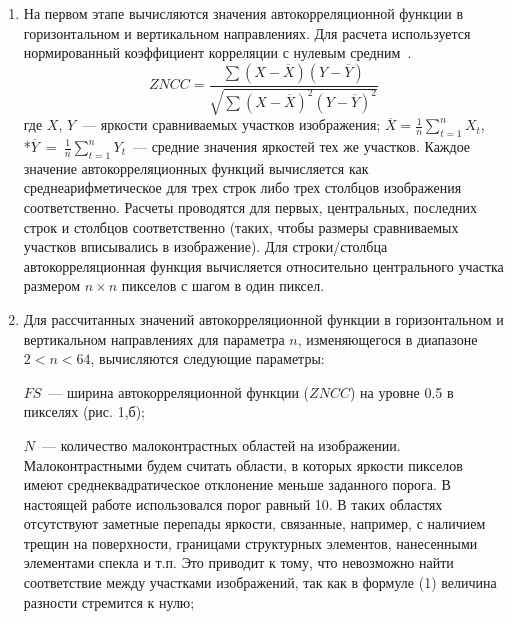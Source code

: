 \documentclass[a4paper]{jctart10}
\begin{document}
\begin{enumerate}
\item На первом этапе вычисляются значения автокорреляционной функции в горизонтальном и вертикальном направлениях. Для расчета используется нормированный коэффициент корреляции с нулевым средним~\cite{13, 14}.
\begin{equation}
ZNCC =\frac{\sum(X-\overline{X})(Y-\overline{Y})}{\sqrt{\sum(X-\overline{X})^{2}(Y-\overline{Y})^{2}}}
\end{equation}
где $X$, $Y$~--- яркости сравниваемых участков изображения;
$\overline{X} = \frac{1}{n}\sum^{n}_{t=1}X_{t}$,\\*$\overline{Y}~=~\frac{1}{n}\sum^{n}_{t=1}Y_{t}$~--- средние значения яркостей тех же участков. Каждое значение автокорреляционных функций вычисляется как среднеарифметическое для трех строк либо трех столбцов изображения соответственно. Расчеты проводятся для первых, центральных, последних строк и столбцов соответственно (таких, чтобы размеры сравниваемых участков вписывались в изображение). Для строки/столбца автокорреляционная функция вычисляется относительно центрального участка размером $n \times n$ пикселов с шагом в один пиксел.
\item Для рассчитанных значений автокорреляционной функции в горизонтальном и вертикальном направлениях для параметра $n$, изменяющегося в диапазоне $2 < n < 64$, вычисляются следующие параметры:

$FS$~--- ширина автокорреляционной функции ($ZNCC$) на уровне 0.5 в пикселях (рис. 1,б);

$N$~--- количество малоконтрастных областей на изображении. Малоконтрастными будем считать области, в которых яркости пикселов имеют среднеквадратическое отклонение меньше заданного порога. В настоящей работе использовался порог равный 10. В таких областях отсутствуют заметные перепады яркости, связанные, например, с наличием трещин на поверхности, границами структурных элементов, нанесенными элементами спекла и т.п. Это приводит к тому, что невозможно найти соответствие между участками изображений, так как в формуле (1) величина разности стремится к нулю;


\end{enumerate}
\end{document}
